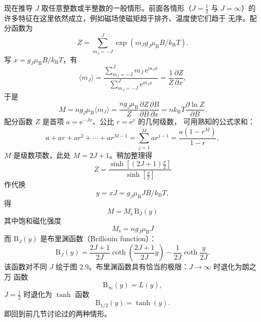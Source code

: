 现在推导 $J$ 取任意整数或半整数的一般情形。前面各情形（$J=\frac{1}{2}$ 与
$J=\infty$）的许多特征在这里依然成立，例如磁场使磁矩趋于排齐、温度使它们趋于
无序。配分函数为
\begin{equation*}
Z = \sum_{m_J=-J}^{J}\exp(m_J g_J\mu_{\mathrm{B}}B/k_{\mathrm{B}}T).\tag{2.32}
\end{equation*}
写 $x=g_J\mu_{\mathrm{B}}B/k_{\mathrm{B}}T$，有
\begin{equation*}
\langle m_J\rangle = \frac{\sum_{m_J=-J}^{J}m_J\,\mathrm{e}^{m_Jx}}{\sum_{m_J=-J}^{J}\mathrm{e}^{m_Jx}} = \frac{1}{Z}\frac{\partial Z}{\partial x},\tag{2.33}
\end{equation*}
于是
\begin{equation*}
M = ng_J\mu_{\mathrm{B}}\langle m_J\rangle = \frac{ng_J\mu_{\mathrm{B}}}{Z}\frac{\partial Z}{\partial B}\frac{\partial B}{\partial x} = nk_{\mathrm{B}}T\frac{\partial\ln Z}{\partial B}.\tag{2.34}
\end{equation*}
配分函数 $Z$ 是首项 $a=\mathrm{e}^{-Jx}$、公比 $r=\mathrm{e}^{x}$ 的几何级数，
可用熟知的公式求和：
\begin{equation*}
a+ar+ar^{2}+\cdots+ar^{M-1} = \sum_{j=1}^{M}ar^{j-1} = \frac{a(1-r^{M})}{1-r},\tag{2.35}
\end{equation*}
$M$ 是级数项数，此处 $M=2J+1$。稍加整理得
\begin{equation*}
Z = \frac{\sinh[(2J+1)\frac{x}{2}]}{\sinh[\frac{x}{2}]}\tag{2.36}
\end{equation*}
作代换
\begin{equation*}
y = xJ = g_J\mu_{\mathrm{B}}JB/k_{\mathrm{B}}T,\tag{2.37}
\end{equation*}
得
\begin{equation*}
M = M_{\mathrm{s}}\,\mathrm{B}_J(y)\tag{2.38}
\end{equation*}
其中饱和磁化强度
\begin{equation*}
M_{\mathrm{s}} = ng_J\mu_{\mathrm{B}}J\tag{2.39}
\end{equation*}
而 $\mathrm{B}_J(y)$ 是布里渊函数（Brillouin function）：
\begin{equation*}
\mathrm{B}_J(y) = \frac{2J+1}{2J}\coth\left(\frac{2J+1}{2J}y\right) - \frac{1}{2J}\coth\frac{y}{2J}.\tag{2.40}
\end{equation*}
该函数对不同 $J$ 绘于图 2.9。布里渊函数具有恰当的极限：$J\to\infty$ 时退化为朗之万
函数
\begin{equation*}
\mathrm{B}_{\infty}(y) = L(y),\tag{2.41}
\end{equation*}
$J=\frac{1}{2}$ 时退化为 $\tanh$ 函数
\begin{equation*}
\mathrm{B}_{1/2}(y) = \tanh(y).\tag{2.42}
\end{equation*}
即回到前几节讨论过的两种情形。

